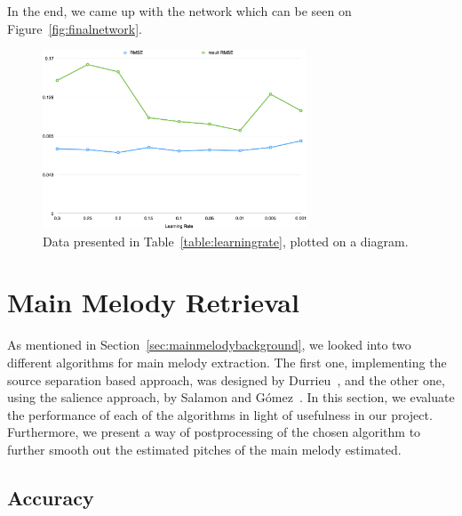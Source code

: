 In the end, we came up with the network which can be seen on Figure~\ref{fig:finalnetwork}.

\begin{figure}[h]
	\centering
   \includegraphics[width=0.7\textwidth]{Figures/learningrate}
\caption{Data presented in Table~\ref{table:learningrate}, plotted on a diagram.}
\end{figure}

\vspace{20pt}

\section{Main Melody Retrieval}
\vspace{10pt}

As mentioned in Section~\ref{sec:mainmelodybackground}, we looked into two different algorithms for main melody extraction. The first one, implementing the source separation based approach, was designed by Durrieu~\cite{durrieu}, and the other one, using the salience approach, by Salamon and G\'{o}mez~\cite{salamon}. In this section, we evaluate the performance of each of the algorithms in light of usefulness in our project. Furthermore, we present a way of postprocessing of the chosen algorithm to further smooth out the estimated pitches of the main melody estimated.

\vspace{10pt}


\subsection{Accuracy}

